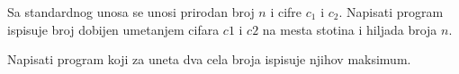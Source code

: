 \begin{Exercise}[label=p1_16]
Sa standardnog unosa se unosi prirodan broj $n$ i cifre $c_1$ i $c_2$. Napisati program ispisuje broj dobijen umetanjem cifara $c1$ i $c2$ na mesta stotina i hiljada broja $n$. 

\end{Exercise}
\begin{Answer}[ref=p1_16]
\end{Answer}

\begin{Exercise}[label=p1_17]
Napisati program koji za uneta dva cela broja ispisuje njihov maksimum. \\
\end{Exercise}
\begin{Answer}[ref=p1_17]
\end{Answer}

